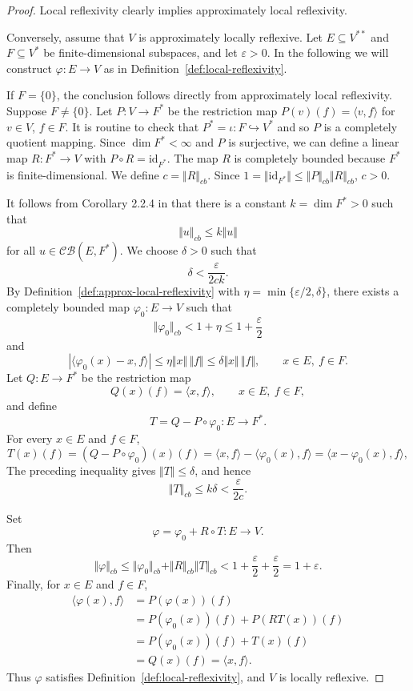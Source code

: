 \documentclass[12pt]{article}
\theoremstyle{definition}
\theoremstyle{remark}
\begin{document}
\begin{proof}
Local reflexivity clearly implies approximately local reflexivity.

Conversely, assume that $V$ is approximately locally reflexive. Let
$E\subseteq V^{**}$ and $F\subseteq V^*$ be finite-dimensional subspaces,
and let $\varepsilon>0$.  In the following we will construct $\varphi:E\to V$ as in
Definition~\ref{def:local-reflexivity}.

If $F=\{0\}$, the conclusion follows directly from approximately local
reflexivity. Suppose $F\ne\{0\}$. Let $P:V\to F^*$ be the
restriction map $P(v)(f)=\langle v,f\rangle$ for $v\in V$, $f\in F$. It is routine to check that $P^*=\iota: F\hookrightarrow V^{*}$ and so $P$ is a completely  quotient mapping. 
Since $\dim F^{*}<\infty$ and $P$ is surjective,  we can define a linear
map $R:F^*\to V$ with $P\circ R=\mathrm{id}_{F^*}$. The map $R$ is completely
bounded because $F^*$ is finite-dimensional. We define $c=\Vert R\Vert_{cb}$. Since $1=\Vert\mathrm{id}_{F^*}\Vert \leq \Vert P\Vert_{cb}\Vert R\Vert_{cb}$, $c>0$.

 It follows from Corollary 2.2.4 in 
\cite{ER00} that there is a constant $k=\dim F^{*}>0$ such that
\[
\Vert u\Vert_{cb}\le k\Vert u\Vert
\]
for all $u\in\mathcal{CB}(E,F^*)$.
We choose $\delta>0$ such that
\[
\delta<\frac{\varepsilon}{2ck}.
\]
By Definition~\ref{def:approx-local-reflexivity} with
$\eta=\min\{\varepsilon/2,\delta\}$, there exists a completely bounded map
$\varphi_0:E\to V$ such that
\[
\Vert \varphi_0\Vert_{cb}<1+\eta\leq1+\frac{\varepsilon}{2}
\]
and
\[
|\langle \varphi_0(x)-x,f\rangle|
\leq  \eta\Vert x\Vert\,\Vert f\Vert \leq \delta\Vert x\Vert\,\Vert f\Vert,
\qquad x\in E,\ f\in F.
\]
Let $Q:E\to F^*$ be the restriction map
\[
Q(x)(f)=\langle x,f\rangle,\qquad x\in E,\ f\in F,
\]
and define
\[
T=Q-P\circ \varphi_0:E\to F^*.
\]
For every $x\in E$ and $f\in F$,
\[
T(x)(f)=(Q-P\circ \varphi_0)(x)(f)
=\langle x,f\rangle-\langle \varphi_0(x),f\rangle
=\langle x-\varphi_0(x),f\rangle,
\]
The preceding inequality gives $\Vert T\Vert\le\delta$, and hence
\[
\Vert T\Vert_{cb}\le k\delta<\frac{\varepsilon}{2c}.
\]

Set
\[
\varphi=\varphi_0+R\circ T:E\to V.
\]
Then
\[
\Vert \varphi\Vert_{cb}
\le \Vert \varphi_0\Vert_{cb}+\Vert R\Vert_{cb}\Vert T\Vert_{cb}
<1+\frac{\varepsilon}{2}+\frac{\varepsilon}{2}
=1+\varepsilon.
\]
Finally, for $x\in E$ and $f\in F$,
\[
\begin{aligned}
\langle \varphi(x),f\rangle
&=P(\varphi(x))(f)\\
&=P(\varphi_0(x))(f)+P(RT(x))(f)\\
&=P(\varphi_0(x))(f)+T(x)(f)\\
&=Q(x)(f)
=\langle x,f\rangle .
\end{aligned}
\]
Thus $\varphi$ satisfies Definition~\ref{def:local-reflexivity}, and $V$ is locally reflexive.
\end{proof}
\end{document}
